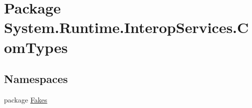 \hypertarget{namespace_system_1_1_runtime_1_1_interop_services_1_1_com_types}{\section{Package System.\-Runtime.\-Interop\-Services.\-Com\-Types}
\label{namespace_system_1_1_runtime_1_1_interop_services_1_1_com_types}
}
\subsection*{Namespaces}
\begin{DoxyCompactItemize}
\item 
package \hyperlink{namespace_system_1_1_runtime_1_1_interop_services_1_1_com_types_1_1_fakes}{Fakes}
\end{DoxyCompactItemize}
